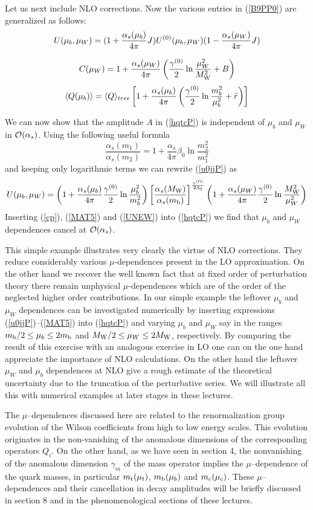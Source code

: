 \documentclass[12pt]{article}
\def\as{\alpha_s}
\newcommand{\mt}{m_{\rm t}}
\newcommand{\mc}{m_{\rm c}}
\newcommand{\mb}{m_{\rm b}}
\newcommand{\mw}{M_{\rm W}}
\newcommand{\be}{\begin{equation}}
\newcommand{\ee}{\end{equation}}
\newcommand{\ord}{{\cal O}}
\begin{document}
\begin{itemize}
\begin{itemize}
Let us next include NLO corrections. Now  the various entries in
(\ref{B9PP0}) are generalized as follows:
\begin{equation}\label{u0jjP}
 U(\mu_b,\mu_W)=
(1+{\as(\mu_b)\over 4\pi} J )  U^{(0)}(\mu_b,\mu_W) 
(1-{\as(\mu_W)\over 4\pi} J)
\end{equation}

\be\label{cp}
C(\mu_W)=1+ {\as(\mu_W)\over 4\pi}\left ( \frac{\gamma^{(0)}}{2}
\ln\frac{\mu_W^2}{\mw^2}+B\right)
\ee
\be\label{MAT5}
\langle Q(\mu_b)\rangle=\langle Q \rangle_{tree}\left[1+
{\as(\mu_b)\over 4\pi}\left( \frac{\gamma^{(0)}}{2}
\ln\frac{m_b^2}{\mu_b^2}+\tilde r\right)\right]
\ee

We can now show that the amplitude $A$ in (\ref{hqtcP})  
is independent of $\mu_b$ and $\mu_W$ 
in $\ord(\as)$.
Using the following useful formula 
\be
\frac{\as(m_1)}{\as(m_2)}=1+\frac{\as}{4\pi}\beta_0\ln\frac{m_2^2}{m_1^2}
\ee
and keeping only logarithmic terms
we can rewrite (\ref{u0jjP}) as
\be\label{UNEW}
U(\mu_b,\mu_W)=\left (1+
{\as(\mu_b)\over 4\pi} \frac{\gamma^{(0)}}{2}
\ln\frac{\mu_b^2}{m_b^2}\right)
\left[\frac{\as(\mw)}{\as(\mb)}\right]^{\frac{\gamma^{(0)}}{2\beta_0}} 
\left(1+ {\as(\mu_W)\over 4\pi} \frac{\gamma^{(0)}}{2}
\ln\frac{\mw^2}{\mu_W^2}\right)
\ee
Inserting (\ref{cp}), (\ref{MAT5}) and (\ref{UNEW}) into
(\ref{hqtcP}) we find that $\mu_b$ and $\mu_W$ dependences cancel
at $\ord(\as)$.

This simple example illustrates very clearly the virtue of NLO
corrections. They reduce considerably various $\mu$-dependences
present in the LO approximation. On the other hand we recover the
well known fact that at fixed order of perturbation theory there
remain unphysical $\mu$-dependences which are of the order of the
neglected higher order contributions. In our simple example the
leftover $\mu_b$ and $\mu_W$ dependences can be investigated
numerically by inserting expressions (\ref{u0jjP})--(\ref{MAT5}) into 
(\ref{hqtcP}) and varying $\mu_b$ and $\mu_W$ say in the ranges
$\mb/2\le \mu_b \le 2 \mb$ and $\mw/2\le \mu_W\le 2 \mw$, respectively.
By comparing the result of this exercise with an analogous exercise
in LO one can on the one hand appreciate the importance of NLO
calculations. On the other hand the leftover $\mu_W$ and $\mu_b$
dependences
at NLO give a rough estimate of the theoretical uncertainty due
to the truncation of the perturbative series. We will illustrate
all this with numerical examples at later stages in these
lectures.

The $\mu$--dependences discussed here are related to the renormalization
group evolution of the Wilson coefficients from high to low energy
scales. This evolution originates in the non-vanishing of the
anomalous dimensions of the corresponding operators $Q_i$.
On the other hand, as we have seen in section 4, the nonvanishing of 
the anomalous dimension
$\gamma_m$ of the mass operator implies the $\mu$--dependence of
the quark masses, in particular $\mt(\mu_t)$, 
$\mb(\mu_b)$ and $\mc(\mu_c)$. These $\mu$--dependences and their 
cancellation in decay amplitudes
will be briefly discussed in section 8 and in the phenomenological
sections of these lectures.


\end{itemize}
\end{itemize}
\end{document}
